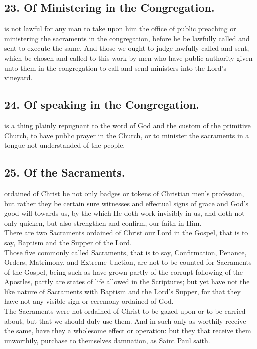 \subsection{23. Of Ministering in the Congregation.}
 is not lawful for any man to take upon him the office of public preaching or ministering the sacraments in the congregation, before he be lawfully called and sent to execute the same. And those we ought to judge lawfully called and sent, which be chosen and called to this work by men who have public authority given unto them in the congregation to call and send ministers into the Lord's vineyard.

\subsection{24. Of speaking in the Congregation.}
 is a thing plainly repugnant to the word of God and the custom of the primitive Church, to have public prayer in the Church, or to minister the sacraments in a tongue not understanded of the people.

\subsection{25. Of the Sacraments.}
 ordained of Christ be not only badges or tokens of Christian men's profession, but rather they be certain sure witnesses and effectual signs of grace and God's good will towards us, by the which He doth work invisibly in us, and doth not only quicken, but also strengthen and confirm, our faith in Him.\\
There are two Sacraments ordained of Christ our Lord in the Gospel, that is to say, Baptism and the Supper of the Lord.\\
Those five commonly called Sacraments, that is to say, Confirmation, Penance, Orders, Matrimony, and Extreme Unction, are not to be counted for Sacraments of the Gospel, being such as have grown partly of the corrupt following of the Apostles, partly are states of life allowed in the Scriptures; but yet have not the like nature of Sacraments with Baptism and the Lord's Supper, for that they have not any visible sign or ceremony ordained of God.\\
The Sacraments were not ordained of Christ to be gazed upon or to be carried about, but that we should duly use them. And in such only as worthily receive the same, have they a wholesome effect or operation: but they that receive them unworthily, purchase to themselves damnation, as Saint Paul saith.

